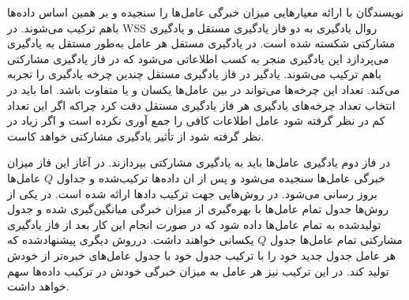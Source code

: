 نویسندگان با ارائه معیارهایی میزان خبرگی عامل‌ها را سنجیده و بر همین اساس داده‌ها باهم ترکیب می‌شوند. در WSS روال یادگیری به دو فاز یادگیری مستقل و یادگیری مشارکتی شکسته شده است.
در یادگیری مستقل هر عامل به‌طور مستقل به یادگیری می‌پردازد این یادگیری منجر به کسب اطلاعاتی می‌شود که در فاز یادگیری مشارکتی باهم ترکیب می‌شوند. یادگیر در فاز یادگیری مستقل چندین چرخه یادگیری را تجربه می‌کند. تعداد این چرخه‌ها می‌تواند در بین عامل‌ها یکسان و یا متفاوت باشد. اما باید در انتخاب تعداد چرخه‌های یادگیری هر فاز یادگیری مستقل دقت کرد چراکه اگر این تعداد کم در نظر گرفته شود عامل اطلاعات کافی را جمع آوری نکرده است و اگر زیاد در نظر گرفته شود از تأثیر یادگیری مشارکتی خواهد کاست.

در فاز دوم یادگیری عامل‌ها باید به یادگیری مشارکتی بپردازند. در آغاز این فاز میزان خبرگی عامل‌ها سنجیده می‌شود و پس از ان داده‌ها ترکیب‌شده و جداول $Q$ عامل‌ها بروز رسانی می‌شود. در روش‌هایی جهت ترکیب دادها ارائه‌ شده است. در یکی از روش‌ها جدول تمام عامل‌ها با بهره‌گیری از میزان خبرگی میانگین‌گیری شده و جدول تولیدشده به تمام عامل‌ها داده شود که در صورت انجام این کار بعد از فاز یادگیری مشارکتی تمام عامل‌ها جدول $Q$ یکسانی خواهند داشت. درروش دیگری پیشنهادشده که هر عامل جدول جدید خود را با ترکیب جدول خود با جدول عامل‌های خبره‌تر از خودش تولید کند. در این ترکیب نیز هر عامل به میزان خبرگی خودش در ترکیب داده‌ها سهم خواهد داشت.


